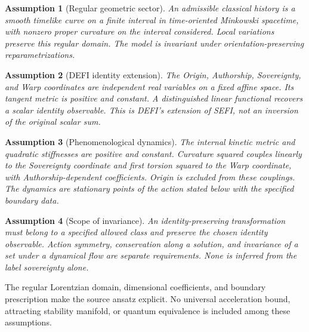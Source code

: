 \documentclass[aip,jmp,reprint,onecolumn,amsmath,amssymb]{revtex4-2}
\newtheorem{axiom}{Assumption}
\begin{document}
\begin{axiom}[Regular geometric sector]
An admissible classical history is a smooth timelike curve on a finite interval in time-oriented Minkowski spacetime, with nonzero proper curvature on the interval considered. Local variations preserve this regular domain. The model is invariant under orientation-preserving reparametrizations.
\end{axiom}
\begin{axiom}[DEFI identity extension]
The Origin, Authorship, Sovereignty, and Warp coordinates are independent real variables on a fixed affine space. Its tangent metric is positive and constant. A distinguished linear functional recovers a scalar identity observable. This is DEFI's extension of SEFI, not an inversion of the original scalar sum.
\end{axiom}
\begin{axiom}[Phenomenological dynamics]
The internal kinetic metric and quadratic stiffnesses are positive and constant. Curvature squared couples linearly to the Sovereignty coordinate and first torsion squared to the Warp coordinate, with Authorship-dependent coefficients. Origin is excluded from these couplings. The dynamics are stationary points of the action stated below with the specified boundary data.
\end{axiom}
\begin{axiom}[Scope of invariance]
An identity-preserving transformation must belong to a specified allowed class and preserve the chosen identity observable. Action symmetry, conservation along a solution, and invariance of a set under a dynamical flow are separate requirements. None is inferred from the label sovereignty alone.
\end{axiom}
The regular Lorentzian domain, dimensional coefficients, and boundary prescription make the source ansatz explicit. No universal acceleration bound, attracting stability manifold, or quantum equivalence is included among these assumptions.
\end{document}
